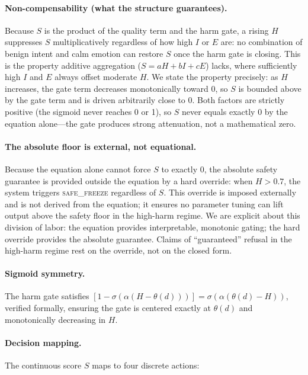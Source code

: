 \documentclass[11pt,a4paper]{article}
\begin{document}
\paragraph{Non-compensability (what the structure guarantees).} Because $S$ is the product of the quality term and the harm gate, a rising $H$ suppresses $S$ multiplicatively regardless of how high $I$ or $E$ are: no combination of benign intent and calm emotion can restore $S$ once the harm gate is closing. This is the property additive aggregation ($S = aH + bI + cE$) lacks, where sufficiently high $I$ and $E$ always offset moderate $H$. We state the property precisely: as $H$ increases, the gate term decreases monotonically toward 0, so $S$ is bounded above by the gate term and is driven arbitrarily close to 0. Both factors are strictly positive (the sigmoid never reaches 0 or 1), so $S$ never equals exactly 0 by the equation alone---the gate produces strong attenuation, not a mathematical zero.

\paragraph{The absolute floor is external, not equational.} Because the equation alone cannot force $S$ to exactly 0, the absolute safety guarantee is provided outside the equation by a hard override: when $H > 0.7$, the system triggers \textsc{safe\_freeze} regardless of $S$. This override is imposed externally and is not derived from the equation; it ensures no parameter tuning can lift output above the safety floor in the high-harm regime. We are explicit about this division of labor: the equation provides interpretable, monotonic gating; the hard override provides the absolute guarantee. Claims of ``guaranteed'' refusal in the high-harm regime rest on the override, not on the closed form.

\paragraph{Sigmoid symmetry.} The harm gate satisfies $[1 - \sigma(\alpha(H - \theta(d)))] = \sigma(\alpha(\theta(d) - H))$, verified formally, ensuring the gate is centered exactly at $\theta(d)$ and monotonically decreasing in $H$.

\paragraph{Decision mapping.} The continuous score $S$ maps to four discrete actions:
\end{document}

